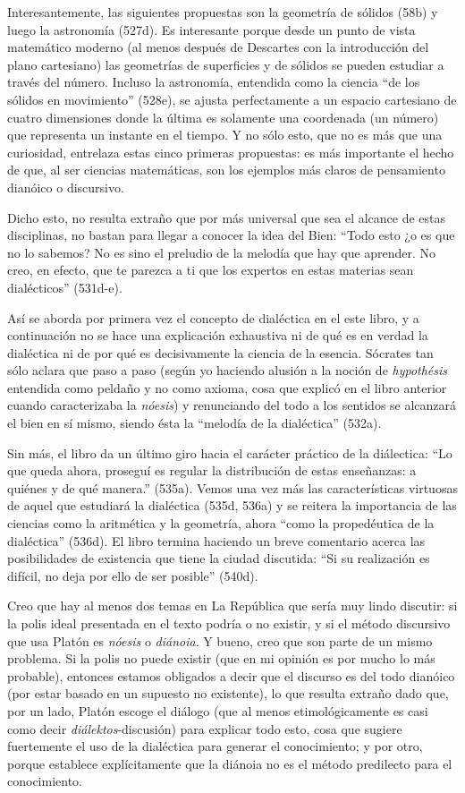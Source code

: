 Interesantemente, las siguientes propuestas
son la geometría de sólidos (58b) y luego la
astronomía (527d). Es interesante porque
desde un punto de vista matemático moderno
(al menos después de Descartes con la
introducción del plano cartesiano) las
geometrías de superficies y de sólidos se
pueden estudiar a través del número. Incluso
la astronomía, entendida como la ciencia ``de
los sólidos en movimiento'' (528e), se ajusta
perfectamente a un espacio cartesiano de
cuatro dimensiones donde la última es
solamente una coordenada (un número) que
representa un instante en el tiempo. Y no
sólo esto, que no es más que una curiosidad,
entrelaza estas cinco primeras propuestas: es
más importante el hecho de que, al ser
ciencias matemáticas, son los ejemplos más
claros de pensamiento dianóico o discursivo.

Dicho esto, no resulta extraño que por más
universal que sea el alcance de estas
disciplinas, no bastan para llegar a conocer
la idea del Bien: ``Todo esto ¿o es que no lo
sabemos? No es sino el preludio de la melodía
que hay que aprender. No creo, en efecto, que
te parezca a ti que los expertos en estas
materias sean dialécticos'' (531d-e).

Así se aborda por primera vez el concepto de
dialéctica en el este libro, y a continuación
no se hace una explicación exhaustiva ni de
qué es en verdad la dialéctica ni de por qué
es decisivamente la ciencia de la esencia.
Sócrates tan sólo aclara que paso a paso
(según yo haciendo alusión a la noción de
\emph{hypothésis} entendida como peldaño y no
como axioma, cosa que explicó en el libro
anterior cuando caracterizaba la
\emph{nóesis}) y renunciando del todo a los
sentidos se alcanzará el bien en sí mismo,
siendo ésta la ``melodía de la dialéctica''
(532a).

Sin más, el libro da un último giro hacia el
carácter práctico de la diálectica: ``Lo que
queda ahora, proseguí es regular la
distribución de estas enseñanzas: a quiénes y
de qué manera.'' (535a). Vemos una vez más
las características virtuosas de aquel que
estudiará la dialéctica (535d, 536a) y se
reitera la importancia de las ciencias como
la aritmética y la geometría, ahora ``como la
propedéutica de la dialéctica'' (536d). El
libro termina haciendo un breve comentario
acerca las posibilidades de existencia que
tiene la ciudad discutida: ``Si su
realización es difícil, no deja por ello de
ser posible'' (540d).

Creo que hay al menos dos temas en La
República que sería muy lindo discutir: si la
polis ideal presentada en el texto podría o
no existir, y si el método discursivo que usa
Platón es \emph{nóesis} o \emph{diánoia}. Y
bueno, creo que son parte de un mismo
problema. Si la polis no puede existir (que
en mi opinión es por mucho lo más probable),
entonces estamos obligados a decir que el
discurso es del todo dianóico (por estar
basado en un supuesto no existente), lo que
resulta extraño dado que, por un lado, Platón
escoge el diálogo (que al menos
etimológicamente es casi como decir
\emph{diálektos}-discusión) para explicar
todo esto, cosa que sugiere fuertemente el
uso de la dialéctica para generar el
conocimiento; y por otro, porque establece
explícitamente que la diánoia no es el método
predilecto para el conocimiento.

